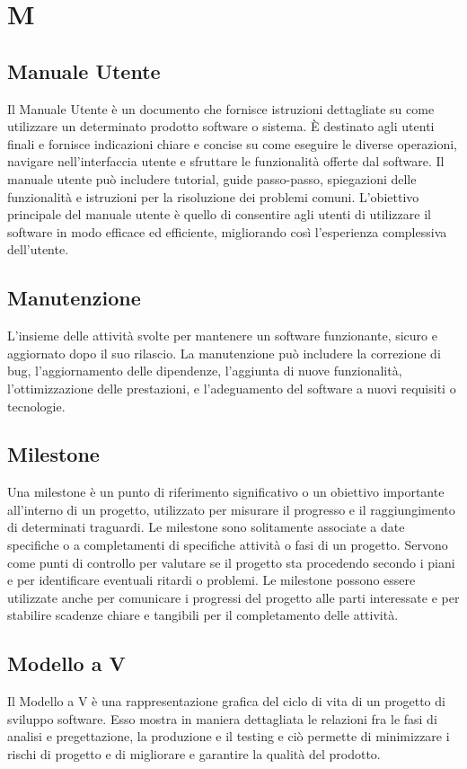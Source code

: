 \section*{M} 
\subsection*{Manuale Utente} 
Il Manuale Utente è un documento che fornisce istruzioni dettagliate su come utilizzare un determinato prodotto software o sistema. È destinato agli utenti finali e fornisce indicazioni chiare e concise su come eseguire le diverse operazioni, navigare nell'interfaccia utente e sfruttare le funzionalità offerte dal software. Il manuale utente può includere tutorial, guide passo-passo, spiegazioni delle funzionalità e istruzioni per la risoluzione dei problemi comuni. L'obiettivo principale del manuale utente è quello di consentire agli utenti di utilizzare il software in modo efficace ed efficiente, migliorando così l'esperienza complessiva dell'utente.
\subsection*{Manutenzione} 
L'insieme delle attività svolte per mantenere un software funzionante, sicuro e aggiornato dopo il suo rilascio. La manutenzione può includere la correzione di bug, l'aggiornamento delle dipendenze, l'aggiunta di nuove funzionalità, l'ottimizzazione delle prestazioni, e l'adeguamento del software a nuovi requisiti o tecnologie.
\subsection*{Milestone} 
Una milestone è un punto di riferimento significativo o un obiettivo importante all'interno di un progetto, utilizzato per misurare il progresso e il raggiungimento di determinati traguardi. Le milestone sono solitamente associate a date specifiche o a completamenti di specifiche attività o fasi di un progetto. Servono come punti di controllo per valutare se il progetto sta procedendo secondo i piani e per identificare eventuali ritardi o problemi. Le milestone possono essere utilizzate anche per comunicare i progressi del progetto alle parti interessate e per stabilire scadenze chiare e tangibili per il completamento delle attività.
\subsection*{Modello a V} 
Il Modello a V è una rappresentazione grafica del ciclo di vita di un progetto di sviluppo software. Esso mostra in maniera dettagliata le relazioni fra le fasi di analisi e pregettazione, la  produzione e il testing e ciò permette di minimizzare i rischi di progetto e di migliorare e garantire la qualità del prodotto.
